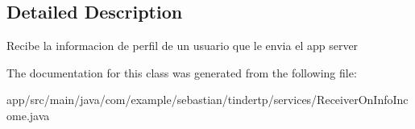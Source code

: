 \subsection{Detailed Description}
Recibe la informacion de perfil de un usuario que le envia el app server 

The documentation for this class was generated from the following file\+:\begin{DoxyCompactItemize}
\item 
app/src/main/java/com/example/sebastian/tindertp/services/Receiver\+On\+Info\+Income.\+java\end{DoxyCompactItemize}
